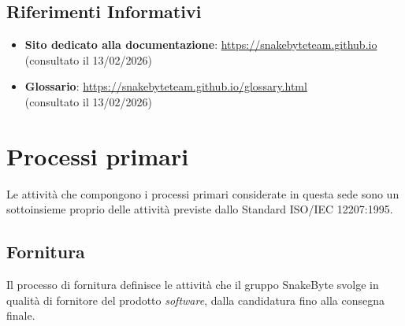 \documentclass[10pt, letterpaper]{article}
\begin{document}
\subsection{Riferimenti Informativi}
\begin{itemize}
    \item \textbf{Sito dedicato alla documentazione}:
        \url{https://snakebyteteam.github.io}
        \\ (consultato il 13/02/2026)
    \item \textbf{Glossario}:
        \url{https://snakebyteteam.github.io/glossary.html}
        \\(consultato il 13/02/2026)
\end{itemize}


\section{Processi primari}
Le attività che compongono i processi primari considerate in questa sede sono un sottoinsieme proprio delle attività previste dallo Standard ISO/IEC 12207:1995.

\subsection{Fornitura}
Il processo di fornitura definisce le attività che il gruppo SnakeByte svolge in qualità di fornitore del prodotto \textit{software}, dalla candidatura fino alla consegna finale.
\end{document}
